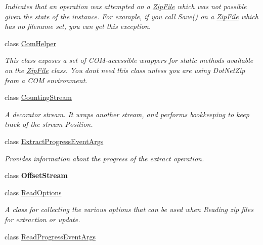 \begin{DoxyCompactItemize}
\begin{DoxyCompactList}\small\item\em Indicates that an operation was attempted on a \mbox{\hyperlink{class_super_tiled2_unity_1_1_ionic_1_1_zip_1_1_zip_file}{Zip\+File}} which was not possible given the state of the instance. For example, if you call {\ttfamily Save()} on a \mbox{\hyperlink{class_super_tiled2_unity_1_1_ionic_1_1_zip_1_1_zip_file}{Zip\+File}} which has no filename set, you can get this exception. \end{DoxyCompactList}\item 
class \mbox{\hyperlink{class_super_tiled2_unity_1_1_ionic_1_1_zip_1_1_com_helper}{Com\+Helper}}
\begin{DoxyCompactList}\small\item\em This class exposes a set of C\+O\+M-\/accessible wrappers for static methods available on the \mbox{\hyperlink{class_super_tiled2_unity_1_1_ionic_1_1_zip_1_1_zip_file}{Zip\+File}} class. You don\textquotesingle{}t need this class unless you are using Dot\+Net\+Zip from a C\+OM environment. \end{DoxyCompactList}\item 
class \mbox{\hyperlink{class_super_tiled2_unity_1_1_ionic_1_1_zip_1_1_counting_stream}{Counting\+Stream}}
\begin{DoxyCompactList}\small\item\em A decorator stream. It wraps another stream, and performs bookkeeping to keep track of the stream Position. \end{DoxyCompactList}\item 
class \mbox{\hyperlink{class_super_tiled2_unity_1_1_ionic_1_1_zip_1_1_extract_progress_event_args}{Extract\+Progress\+Event\+Args}}
\begin{DoxyCompactList}\small\item\em Provides information about the progress of the extract operation. \end{DoxyCompactList}\item 
class {\bfseries Offset\+Stream}
\item 
class \mbox{\hyperlink{class_super_tiled2_unity_1_1_ionic_1_1_zip_1_1_read_options}{Read\+Options}}
\begin{DoxyCompactList}\small\item\em A class for collecting the various options that can be used when Reading zip files for extraction or update. \end{DoxyCompactList}\item 
class \mbox{\hyperlink{class_super_tiled2_unity_1_1_ionic_1_1_zip_1_1_read_progress_event_args}{Read\+Progress\+Event\+Args}}

\end{DoxyCompactItemize}
